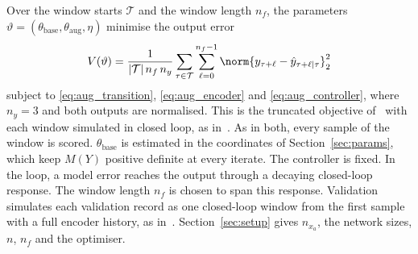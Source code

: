 Over the window starts $\mathcal T$ and the window length $n_f$, the
parameters $\vartheta=(\theta_{\mathrm{base}},\theta_{\mathrm{aug}},\eta)$
minimise the output error
\begin{equation}
 V(\vartheta)=\frac{1}{|\mathcal T|\,n_f\,n_y}
 \sum_{\tau\in\mathcal T}\sum_{\ell=0}^{n_f-1}
 \norm{y_{\tau+\ell}-\hat y_{\tau+\ell|\tau}}_2^2
 \label{eq:aug_loss}
\end{equation}
subject to \eqref{eq:aug_transition}, \eqref{eq:aug_encoder} and
\eqref{eq:aug_controller}, where $n_y=3$ and both outputs are normalised.
This is the truncated objective of~\cite[Eq.~(22)]{hoekstra2026lfr} with
each window simulated in closed loop, as
in~\cite[Eq.~(5.12)]{kessels2025ai}.
As in both, every sample of the window is scored.
$\theta_{\mathrm{base}}$ is estimated in the coordinates of
Section~\ref{sec:params}, which keep $M(Y)$ positive definite at every
iterate.
The controller is fixed.
In the loop, a model error reaches the output through a decaying closed-loop
response.
The window length $n_f$ is chosen to span this response.
Validation simulates each validation record as one closed-loop window from
the first sample with a full encoder history, as
in~\cite[Eq.~(5.14)]{kessels2025ai}.
Section~\ref{sec:setup} gives $n_{x_a}$, the network sizes, $n$, $n_f$ and
the optimiser.
